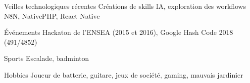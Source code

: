 
\begin{cvskills}

	\cvskill
	{Veilles technologiques récentes} %
	{Créations de skills IA, exploration des workflows N8N, NativePHP, React Native} %

	\cvskill
	{Événements} %
	{Hackaton de l'ENSEA (2015 et 2016), Google Hash Code 2018 (491/4852)} %

	\cvskill
	{Sports} %
	{Escalade, badminton} %


	\cvskill
	{Hobbies} %
	{Joueur de batterie, guitare, jeux de société, gaming, mauvais jardinier} %
\end{cvskills}
